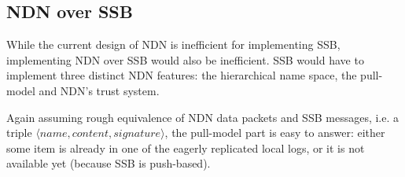 \documentclass[9pt,sigconf]{acmart}
\begin{document}
%
%

\subsection{NDN over SSB}
\label{ssect:ndn-over-ssb}


While the current design of NDN is inefficient for implementing SSB, implementing NDN over SSB would also be inefficient. SSB would have to implement three
distinct NDN features: the hierarchical name space, the pull-model
and NDN's trust system.

Again assuming rough equivalence of NDN data packets and SSB messages,
i.e. a triple $\langle name,content,signature\rangle$, the
pull-model part is easy to answer: either some item is already in one
of the eagerly replicated local logs, or it is not available yet
(because SSB is push-based).
\end{document}
